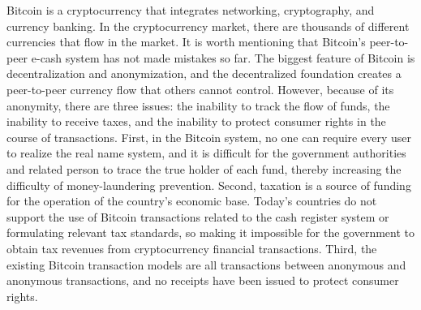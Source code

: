 \begin{eabstract}
	Bitcoin is a cryptocurrency that integrates networking, cryptography, and currency banking. In the cryptocurrency market, there are thousands of different currencies that flow in the market. It is worth mentioning that Bitcoin's peer-to-peer e-cash system has not made mistakes so far. The biggest feature of Bitcoin is decentralization and anonymization, and the decentralized foundation creates a peer-to-peer currency flow that others cannot control. However, because of its anonymity, there are three issues: the inability to track the flow of funds, the inability to receive taxes, and the inability to protect consumer rights in the course of transactions. First, in the Bitcoin system, no one can require every user to realize the real name system, and it is difficult for the government authorities and related person to trace the true holder of each fund, thereby increasing the difficulty of money-laundering prevention. Second, taxation is a source of funding for the operation of the country’s economic base. Today’s countries do not support the use of Bitcoin transactions related to the cash register system or formulating relevant tax standards, so making it impossible for the government to obtain tax revenues from cryptocurrency financial transactions. Third, the existing Bitcoin transaction models are all transactions between anonymous and anonymous transactions, and no receipts have been issued to protect consumer rights.


\end{eabstract}
